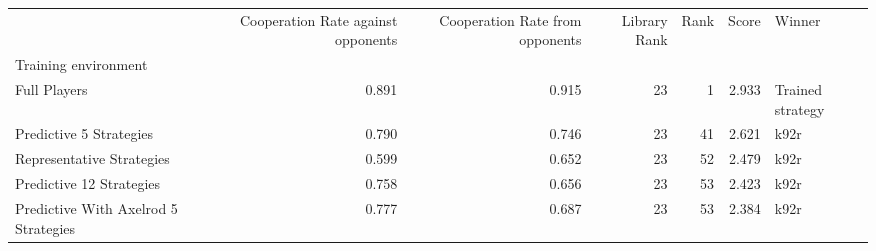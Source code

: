 \begin{tabular}{lrrrrrl}
\toprule
{} &  Cooperation Rate against opponents &  Cooperation Rate from opponents &  Library Rank &  Rank &  Score &            Winner \\
Training environment                 &                                     &                                  &               &       &        &                   \\
\midrule
Full Players                         &                               0.891 &                            0.915 &            23 &     1 &  2.933 &  Trained strategy \\
Predictive 5 Strategies              &                               0.790 &                            0.746 &            23 &    41 &  2.621 &              k92r \\
Representative Strategies            &                               0.599 &                            0.652 &            23 &    52 &  2.479 &              k92r \\
Predictive 12 Strategies             &                               0.758 &                            0.656 &            23 &    53 &  2.423 &              k92r \\
Predictive With Axelrod 5 Strategies &                               0.777 &                            0.687 &            23 &    53 &  2.384 &              k92r \\
\bottomrule
\end{tabular}
